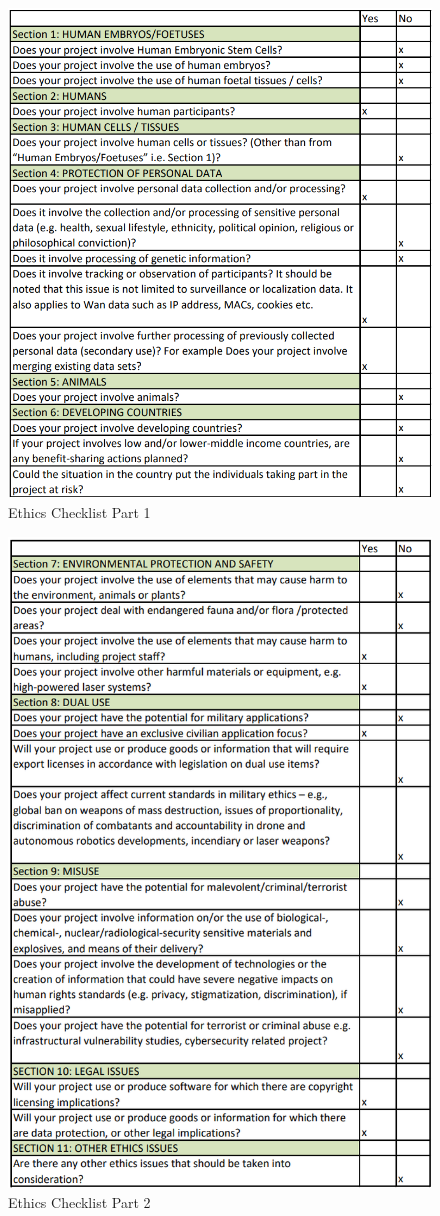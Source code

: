 \begin{figure}[h]
\centering
\includegraphics[width = 0.82\hsize]{figures/other/ethics-1.png}
\caption{Ethics Checklist Part 1}
\label{fig:ethics-1}
\end{figure}

\begin{figure}[h]
\centering
\includegraphics[width = 0.82\hsize]{figures/other/ethics-2.png}
\caption{Ethics Checklist Part 2}
\label{fig:ethics-2}
\end{figure}
